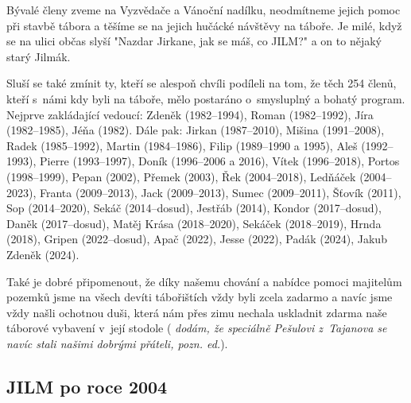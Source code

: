 \documentclass[a5paper, 11pt, twoside]{article}
\newcommand{\pozned}[1]{%
\textit{#1}}
\begin{document}
Bývalé členy zveme na Vyzvědače a Vánoční nadílku, neodmítneme jejich
pomoc při stavbě tábora a těšíme se na jejich hučácké návštěvy na
táboře. Je milé, když se na ulici občas slyší "Nazdar Jirkane, jak se
máš, co JILM?" a on to nějaký starý Jilmák.

Sluší se také zmínit ty, kteří se alespoň chvíli podíleli na tom, že
těch 254 členů, kteří s~námi kdy byli na táboře, mělo postaráno
o~smysluplný a bohatý program. Nejprve zakládající vedoucí: Zdeněk
(1982--1994), Roman (1982--1992), Jíra (1982--1985), Jéňa (1982). Dále
pak: Jirkan (1987--2010), Mišina (1991--2008), Radek (1985--1992),
Martin (1984--1986), Filip (1989--1990 a 1995), Aleš (1992--1993),
Pierre (1993--1997), Doník (1996--2006 a 2016), Vítek (1996--2018),
Portos (1998--1999), Pepan (2002), Přemek (2003), Řek (2004--2018),
Ledňáček (2004--2023), Franta (2009--2013), Jack (2009--2013), Sumec
(2009--2011), Šťovík (2011), Sop (2014--2020), Sekáč (2014--dosud),
Jestřáb (2014), Kondor (2017--dosud), Daněk (2017--dosud), Matěj Krása
(2018--2020), Sekáček (2018--2019), Hrnda (2018), Gripen (2022--dosud),
Apač (2022), Jesse (2022), Padák (2024), Jakub Zdeněk (2024).

Také je dobré připomenout, že díky našemu chování a nabídce pomoci
majitelům pozemků jsme na všech devíti tábořištích vždy byli zcela
zadarmo a navíc jsme vždy našli ochotnou duši, která nám přes zimu
nechala uskladnit zdarma naše táborové vybavení v~její stodole
(\pozned{dodám, že speciálně Pešulovi z~Tajanova se navíc stali našimi
dobrými přáteli, pozn. ed.}).

\subsection{JILM po roce 2004}
\end{document}
